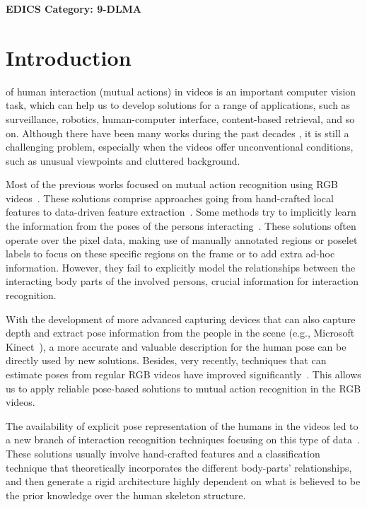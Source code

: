 \documentclass[journal,twoside]{IEEEtran}
\begin{document}
 \ifCLASSOPTIONpeerreview
 \begin{center} \bfseries EDICS Category: 9-DLMA \end{center}
 \fi
\IEEEpeerreviewmaketitle


\section{Introduction} \label{sec:intro}

 of human interaction (mutual actions) in videos is an important computer vision task, which can help us to develop solutions for a range of applications, such as surveillance, robotics, human-computer interface, content-based retrieval, and so on. 
Although there have been many works during the past decades \cite{Ryoo2009,Rapitis2013,Aliakbarian2017,Wang2017,Vahdat2011,Yun2012}, it is still a challenging problem, especially when the videos offer unconventional conditions, such as unusual viewpoints and cluttered background.

Most of the previous works focused on mutual action recognition using RGB videos~\cite{Ryoo2009,Rapitis2013,Aliakbarian2017,Wang2017}.
These solutions comprise approaches going from hand-crafted local features to data-driven feature extraction~\cite{Ryoo2011,Zhang2012,Donahue2015,Aliakbarian2017,Shi2018}.
Some methods try to implicitly learn the information from the poses of the persons interacting~\cite{Vahdat2011,Rapitis2013}.
These solutions often operate over the pixel data, making use of manually annotated regions or poselet labels to focus on these specific regions on the frame or to add extra ad-hoc information.
However, they fail to explicitly model the relationships between the interacting body parts of the involved persons, crucial information for interaction recognition.

With the development of more advanced capturing devices that can also capture depth and extract pose information from the people in the scene (e.g., Microsoft Kinect~\cite{Zhang2012a}), a more accurate and valuable description for the human pose can be directly used by new solutions.
Besides, very recently, techniques that can estimate poses from regular RGB videos have improved significantly~\cite{Cao2018}. This allows us to apply reliable pose-based solutions to mutual action recognition in the RGB videos.

The availability of explicit pose representation of the humans in the videos led to a new branch of interaction recognition techniques focusing on this type of data~\cite{Yun2012,Ji2014,Ji2015,Li2016,Wu2018a,Perez2019a}. 
These solutions usually involve hand-crafted features and a classification technique that theoretically incorporates the different body-parts' relationships, and then generate a rigid architecture highly dependent on what is believed to be the prior knowledge over the human skeleton structure.
\end{document}
